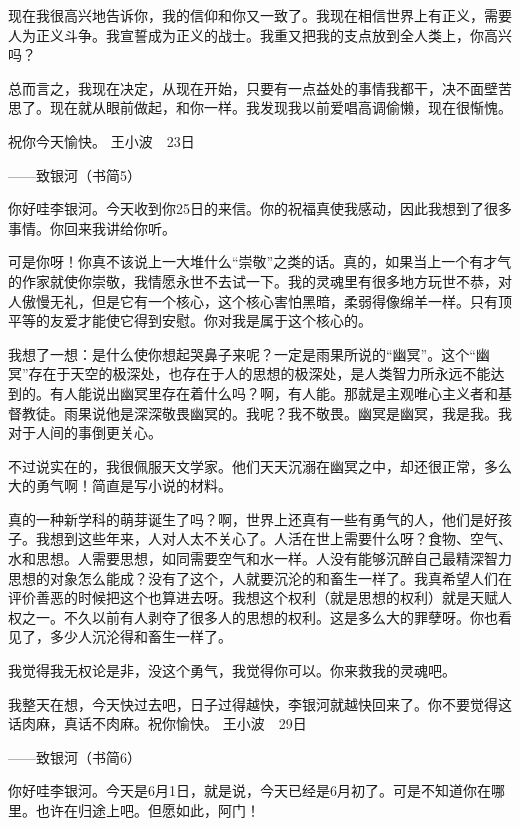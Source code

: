 现在我很高兴地告诉你，我的信仰和你又一致了。我现在相信世界上有正义，需要人为正义斗争。我宣誓成为正义的战士。我重又把我的支点放到全人类上，你高兴吗？ 

总而言之，我现在决定，从现在开始，只要有一点益处的事情我都干，决不面壁苦思了。现在就从眼前做起，和你一样。我发现我以前爱唱高调偷懒，现在很惭愧。 

祝你今天愉快。 王小波　23日 







——致银河（书简5） 

你好哇李银河。今天收到你25日的来信。你的祝福真使我感动，因此我想到了很多事情。你回来我讲给你听。 

可是你呀！你真不该说上一大堆什么“崇敬”之类的话。真的，如果当上一个有才气的作家就使你崇敬，我情愿永世不去试一下。我的灵魂里有很多地方玩世不恭，对人傲慢无礼，但是它有一个核心，这个核心害怕黑暗，柔弱得像绵羊一样。只有顶平等的友爱才能使它得到安慰。你对我是属于这个核心的。 

我想了一想：是什么使你想起哭鼻子来呢？一定是雨果所说的“幽冥”。这个“幽冥”存在于天空的极深处，也存在于人的思想的极深处，是人类智力所永远不能达到的。有人能说出幽冥里存在着什么吗？啊，有人能。那就是主观唯心主义者和基督教徒。雨果说他是深深敬畏幽冥的。我呢？我不敬畏。幽冥是幽冥，我是我。我对于人间的事倒更关心。 

不过说实在的，我很佩服天文学家。他们天天沉溺在幽冥之中，却还很正常，多么大的勇气啊！简直是写小说的材料。 

真的一种新学科的萌芽诞生了吗？啊，世界上还真有一些有勇气的人，他们是好孩子。我想到这些年来，人对人太不关心了。人活在世上需要什么呀？食物、空气、水和思想。人需要思想，如同需要空气和水一样。人没有能够沉醉自己最精深智力思想的对象怎么能成？没有了这个，人就要沉沦的和畜生一样了。我真希望人们在评价善恶的时候把这个也算进去呀。我想这个权利（就是思想的权利）就是天赋人权之一。不久以前有人剥夺了很多人的思想的权利。这是多么大的罪孽呀。你也看见了，多少人沉沦得和畜生一样了。 

我觉得我无权论是非，没这个勇气，我觉得你可以。你来救我的灵魂吧。 

我整天在想，今天快过去吧，日子过得越快，李银河就越快回来了。你不要觉得这话肉麻，真话不肉麻。祝你愉快。 王小波　29日 







——致银河（书简6） 

你好哇李银河。今天是6月1日，就是说，今天已经是6月初了。可是不知道你在哪里。也许在归途上吧。但愿如此，阿门！ 

